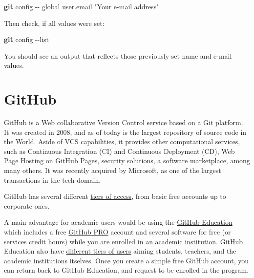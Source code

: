 \documentclass[
]{book}
\newenvironment{Shaded}{\begin{snugshade}}{\end{snugshade}}
\newcommand{\AttributeTok}[1]{\textcolor[rgb]{0.13,0.29,0.53}{#1}}
\newcommand{\FunctionTok}[1]{\textcolor[rgb]{0.13,0.29,0.53}{\textbf{#1}}}
\newcommand{\NormalTok}[1]{#1}
\newcommand{\StringTok}[1]{\textcolor[rgb]{0.31,0.60,0.02}{#1}}
\begin{document}
\begin{Shaded}
\begin{Highlighting}[]
\FunctionTok{git}\NormalTok{ config }\AttributeTok{{-}{-}}\NormalTok{ global user.email }\StringTok{"Your e{-}mail address"}
\end{Highlighting}
\end{Shaded}

Then check, if all values were set:

\begin{Shaded}
\begin{Highlighting}[]
\FunctionTok{git}\NormalTok{ config }\AttributeTok{{-}{-}list}
\end{Highlighting}
\end{Shaded}

You should see an output that reflects those previously set name and e-mail values.

\hypertarget{github}{%
\section{GitHub}\label{github}}

GitHub is a Web collaborative Version Control service based on a Git platform. It was
created in 2008, and as of today is the largest repository of source code in the World.
Aside of VCS capabilities, it provides other computational services, such as
Continuous Integration (CI) and Continuous Deployment (CD), Web Page Hosting on GitHub
Pages, security solutions, a software marketplace, among many others. It was recently
acquired by Microsoft, as one of the largest transactions in the tech domain.

GitHub has several different \href{https://docs.github.com/en/get-started/learning-about-github/githubs-products\#about-githubs-products}{tiers of access},
from basic free accounts up to corporate ones.

A main advantage for academic users would be using the \href{https://education.github.com}{GitHub Education} which includes a free \href{https://docs.github.com/en/get-started/learning-about-github/githubs-products\#github-pro}{GitHub PRO}
account and several software for free (or services credit hours) while you are
enrolled in an academic institution. GitHub Education also have \href{https://education.github.com/benefits}{different tiers of users}
aiming students, teachers, and the academic institutions itselves. Once you
create a simple free GitHub account, you can return back to GitHub Education,
and request to be enrolled in the program.
\end{document}
